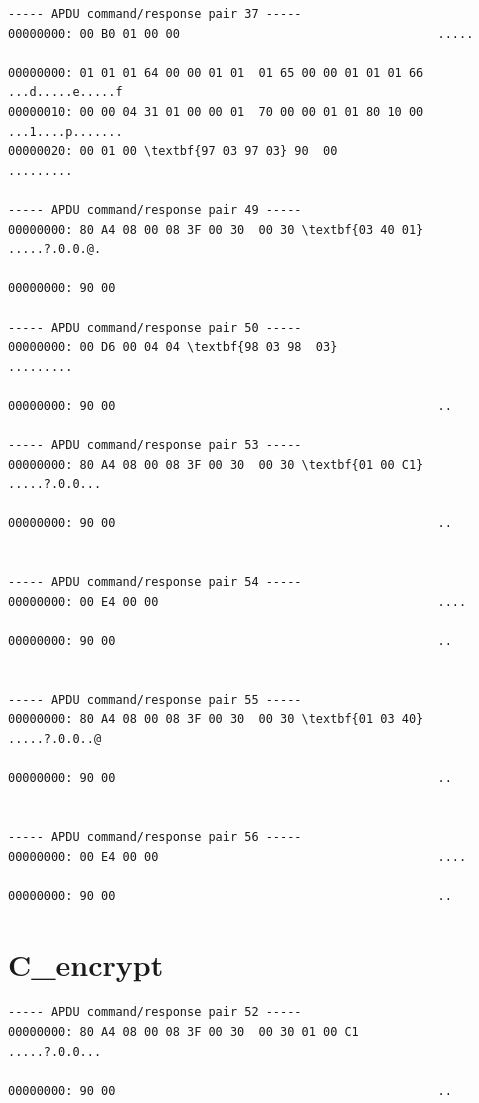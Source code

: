 \documentclass[bsc,frontabs,twoside,singlespacing,parskip,deptreport]{infthesis}     %
\begin{document}
\begin{appendices}
\begin{Verbatim}[commandchars=\\\{\}, fontsize=\small]
----- APDU command/response pair 37 -----
00000000: 00 B0 01 00 00                                    .....

00000000: 01 01 01 64 00 00 01 01  01 65 00 00 01 01 01 66  ...d.....e.....f
00000010: 00 00 04 31 01 00 00 01  70 00 00 01 01 80 10 00  ...1....p.......
00000020: 00 01 00 \textbf{97 03 97 03} 90  00                       .........

----- APDU command/response pair 49 -----
00000000: 80 A4 08 00 08 3F 00 30  00 30 \textbf{03 40 01}           .....?.0.0.@.

00000000: 90 00 

----- APDU command/response pair 50 -----
00000000: 00 D6 00 04 04 \textbf{98 03 98  03}                       .........

00000000: 90 00                                             ..

----- APDU command/response pair 53 -----
00000000: 80 A4 08 00 08 3F 00 30  00 30 \textbf{01 00 C1}           .....?.0.0...

00000000: 90 00                                             ..


----- APDU command/response pair 54 -----
00000000: 00 E4 00 00                                       ....

00000000: 90 00                                             ..


----- APDU command/response pair 55 -----
00000000: 80 A4 08 00 08 3F 00 30  00 30 \textbf{01 03 40}           .....?.0.0..@

00000000: 90 00                                             ..


----- APDU command/response pair 56 -----
00000000: 00 E4 00 00                                       ....

00000000: 90 00                                             ..
\end{Verbatim}

\section{C\_encrypt}
\begin{Verbatim}[commandchars=\\\{\}, fontsize=\small]
----- APDU command/response pair 52 -----
00000000: 80 A4 08 00 08 3F 00 30  00 30 01 00 C1           .....?.0.0...

00000000: 90 00                                             ..



\end{Verbatim}
\end{appendices}
\end{document}
